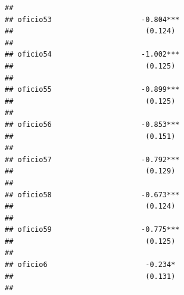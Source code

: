 \documentclass[
]{article}
\begin{document}
\begin{verbatim}
##                                                                                                     
## oficio53                     -0.804***                                                              
##                               (0.124)                                                               
##                                                                                                     
## oficio54                     -1.002***                                                              
##                               (0.125)                                                               
##                                                                                                     
## oficio55                     -0.899***                                                              
##                               (0.125)                                                               
##                                                                                                     
## oficio56                     -0.853***                                                              
##                               (0.151)                                                               
##                                                                                                     
## oficio57                     -0.792***                                                              
##                               (0.129)                                                               
##                                                                                                     
## oficio58                     -0.673***                                                              
##                               (0.124)                                                               
##                                                                                                     
## oficio59                     -0.775***                                                              
##                               (0.125)                                                               
##                                                                                                     
## oficio6                       -0.234*                                                               
##                               (0.131)                                                               
##                                                                                                     

\end{verbatim}
\end{document}
